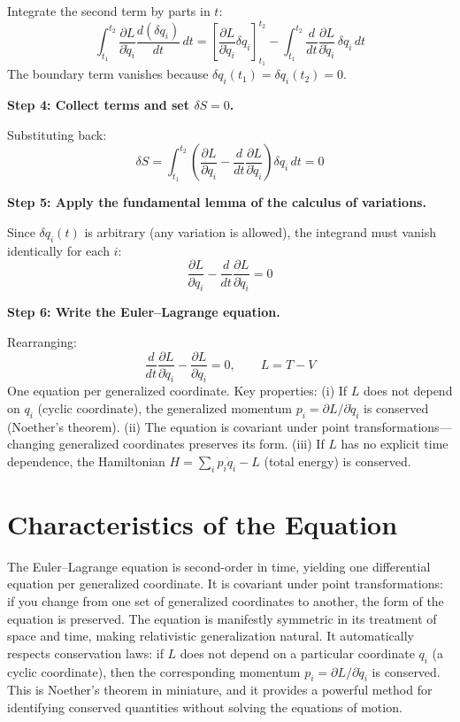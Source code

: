 \documentclass[11pt,openright]{book}
\begin{document}
Integrate the second term by parts in $t$:
\begin{equation}
\int_{t_1}^{t_2}\frac{\partial L}{\partial \dot{q}_i}\frac{d(\delta q_i)}{dt}\, dt = \left[\frac{\partial L}{\partial \dot{q}_i}\delta q_i\right]_{t_1}^{t_2} - \int_{t_1}^{t_2}\frac{d}{dt}\frac{\partial L}{\partial \dot{q}_i}\,\delta q_i\, dt
\end{equation}
The boundary term vanishes because $\delta q_i(t_1) = \delta q_i(t_2) = 0$.

\textbf{Step 4: Collect terms and set $\delta S = 0$.}

Substituting back:
\begin{equation}
\delta S = \int_{t_1}^{t_2}\left(\frac{\partial L}{\partial q_i} - \frac{d}{dt}\frac{\partial L}{\partial \dot{q}_i}\right)\delta q_i\, dt = 0
\end{equation}

\textbf{Step 5: Apply the fundamental lemma of the calculus of variations.}

Since $\delta q_i(t)$ is arbitrary (any variation is allowed), the integrand must vanish identically for each $i$:
\begin{equation}
\frac{\partial L}{\partial q_i} - \frac{d}{dt}\frac{\partial L}{\partial \dot{q}_i} = 0
\end{equation}

\textbf{Step 6: Write the Euler--Lagrange equation.}

Rearranging:
\begin{equation}
\boxed{\frac{d}{dt}\frac{\partial L}{\partial \dot{q}_i} - \frac{\partial L}{\partial q_i} = 0, \qquad L = T - V}
\end{equation}
One equation per generalized coordinate. Key properties: (i) If $L$ does not depend on $q_i$ (cyclic coordinate), the generalized momentum $p_i = \partial L/\partial\dot{q}_i$ is conserved (Noether's theorem). (ii) The equation is covariant under point transformations---changing generalized coordinates preserves its form. (iii) If $L$ has no explicit time dependence, the Hamiltonian $H = \sum_i p_i\dot{q}_i - L$ (total energy) is conserved.

\section*{Characteristics of the Equation}

The Euler--Lagrange equation is second-order in time, yielding one differential equation per generalized coordinate. It is covariant under point transformations: if you change from one set of generalized coordinates to another, the form of the equation is preserved. The equation is manifestly symmetric in its treatment of space and time, making relativistic generalization natural. It automatically respects conservation laws: if $L$ does not depend on a particular coordinate $q_i$ (a cyclic coordinate), then the corresponding momentum $p_i = \partial L / \partial \dot{q}_i$ is conserved. This is Noether's theorem in miniature, and it provides a powerful method for identifying conserved quantities without solving the equations of motion.
\end{document}
